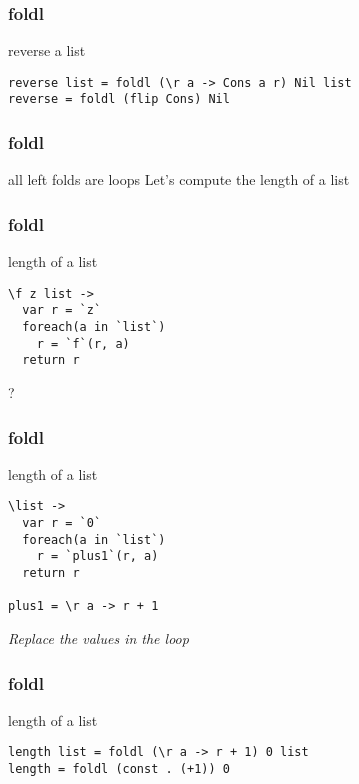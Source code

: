 \begin{frame}[fragile]
\frametitle{foldl}
\begin{block}{reverse a list}
\begin{lstlisting}[style=haskell,basicstyle=\scriptsize\ttfamily,mathescape]
reverse list = foldl (\r a -> Cons a r) Nil list
reverse = foldl (flip Cons) Nil
\end{lstlisting}
\end{block}
\end{frame}

\begin{frame}[fragile]
\frametitle{foldl}
\begin{block}{all left folds are loops}
Let's compute the length of a list
\end{block}
\end{frame}

\begin{frame}[fragile]
\frametitle{foldl}
\begin{block}{length of a list}
\begin{lstlisting}[style=haskell,basicstyle=\scriptsize\ttfamily,mathescape]
\f z list ->
  var r = `z`
  foreach(a in `list`)
    r = `f`(r, a)
  return r
\end{lstlisting}
\end{block}
\begin{center}
\LARGE
?
\end{center}
\end{frame}

\begin{frame}[fragile]
\frametitle{foldl}
\begin{block}{length of a list}
\begin{lstlisting}[style=haskell,basicstyle=\scriptsize\ttfamily,mathescape]
\list ->
  var r = `0`
  foreach(a in `list`)
    r = `plus1`(r, a)
  return r

plus1 = \r a -> r + 1
\end{lstlisting}
\end{block}
\begin{center}
\LARGE
\emph{Replace the values in the loop}
\end{center}
\end{frame}

\begin{frame}[fragile]
\frametitle{foldl}
\begin{block}{length of a list}
\begin{lstlisting}[style=haskell,basicstyle=\scriptsize\ttfamily,mathescape]
length list = foldl (\r a -> r + 1) 0 list
length = foldl (const . (+1)) 0
\end{lstlisting}
\end{block}
\end{frame}

